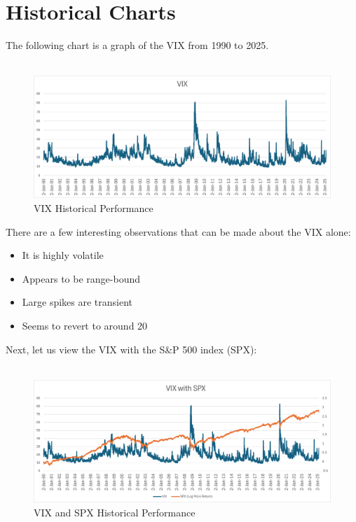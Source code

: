\documentclass[11pt, oneside]{book}
\begin{document}
\section{Historical Charts}  \label{SigOfVIX-Historical}
The following chart is a graph of the VIX from 1990 to 2025.
\\
\\
\begin{figure}[H]
\centering
\includegraphics[width=\textwidth]{VIXOverTime.png}
\caption{VIX Historical Performance} \label{Fig-VIXHistorical}
\end{figure}
\noindent
There are a few interesting observations that can be made about the VIX alone:
\begin{itemize}
    \item It is highly volatile
    \item Appears to be range-bound
    \item Large spikes are transient
    \item Seems to revert to around 20
\end{itemize}
Next, let us view the VIX with the S\&P 500 index (SPX):
\\
\\
\begin{figure}[H]
\centering
\includegraphics[width=\textwidth]{VIXandSPX.png}
\caption{VIX and SPX Historical Performance} \label{Fig-VIXSPXHistorical}
\end{figure}
\noindent
\end{document}
